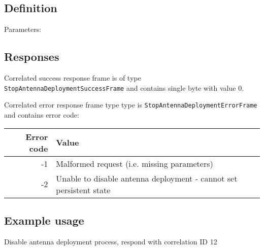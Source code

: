 \subsection{Definition}

Parameters:

\begin{tcarglist}
\end{tcarglist}

\subsection{Responses}


Correlated success response frame is of type \texttt{StopAntennaDeploymentSuccessFrame} and contains single byte with value 0.


Correlated error response frame type type is \texttt{StopAntennaDeploymentErrorFrame} and contains error code:

\begin{tabular}{r | l}
    Error code & Value \\
    \hline
    -1 & Malformed request (i.e. missing parameters) \\
    -2 & Unable to disable antenna deployment - cannot set persistent state
\end{tabular}

\subsection{Example usage}
Disable antenna deployment process, respond with correlation ID 12
